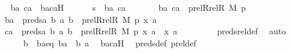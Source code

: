 \begin{isabellebody}
\ \ \ \ \isamarkupfalse%
\ \isamarkupfalse%
\ ba\ ca\ \ bacaH{\isacharcolon}{\kern0pt}\isanewline
\ \ \ \ \ \ {\isachardoublequoteopen}s\ {\isacharequal}{\kern0pt}\ {\isacharless}{\kern0pt}ba{\isacharcomma}{\kern0pt}\ ca{\isachargreater}{\kern0pt}{\isachardoublequoteclose}\ \isanewline
\ \ \ \ \ \ {\isachardoublequoteopen}{\isacharless}{\kern0pt}ba{\isacharcomma}{\kern0pt}\ ca{\isachargreater}{\kern0pt}\ {\isasymin}\ prel{\isacharparenleft}{\kern0pt}Rrel{\isacharparenleft}{\kern0pt}R{\isacharcomma}{\kern0pt}\ M{\isacharparenright}{\kern0pt}{\isacharcomma}{\kern0pt}\ p{\isacharparenright}{\kern0pt}{\isachardoublequoteclose}\ \isanewline
\ \ \ \ \ \ {\isachardoublequoteopen}ba\ {\isasymin}\ preds{\isacharparenleft}{\kern0pt}{\isasymlambda}a\ b{\isachardot}{\kern0pt}\ {\isasymlangle}a{\isacharcomma}{\kern0pt}\ b{\isasymrangle}\ {\isasymin}\ prel{\isacharparenleft}{\kern0pt}Rrel{\isacharparenleft}{\kern0pt}R{\isacharcomma}{\kern0pt}\ M{\isacharparenright}{\kern0pt}{\isacharcomma}{\kern0pt}\ p{\isacharparenright}{\kern0pt}{\isacharcomma}{\kern0pt}\ {\isasymlangle}x{\isacharcomma}{\kern0pt}\ a{\isasymrangle}{\isacharparenright}{\kern0pt}{\isachardoublequoteclose}\ \isanewline
\ \ \ \ \ \ {\isachardoublequoteopen}ca\ {\isasymin}\ {\isacharparenleft}{\kern0pt}preds{\isacharparenleft}{\kern0pt}{\isasymlambda}a\ b{\isachardot}{\kern0pt}\ {\isasymlangle}a{\isacharcomma}{\kern0pt}\ b{\isasymrangle}\ {\isasymin}\ prel{\isacharparenleft}{\kern0pt}Rrel{\isacharparenleft}{\kern0pt}R{\isacharcomma}{\kern0pt}\ M{\isacharparenright}{\kern0pt}{\isacharcomma}{\kern0pt}\ p{\isacharparenright}{\kern0pt}{\isacharcomma}{\kern0pt}\ {\isasymlangle}x{\isacharcomma}{\kern0pt}\ a{\isasymrangle}{\isacharparenright}{\kern0pt}\ {\isasymunion}\ {\isacharbraceleft}{\kern0pt}{\isasymlangle}x{\isacharcomma}{\kern0pt}\ a{\isasymrangle}{\isacharbraceright}{\kern0pt}{\isacharparenright}{\kern0pt}{\isachardoublequoteclose}\ \isanewline
\ \ \ \ \ \ \isamarkupfalse%
\ preds{\isacharunderscore}{\kern0pt}rel{\isacharunderscore}{\kern0pt}def\ \isamarkupfalse%
\ auto\isanewline
\ \ \ \ \isanewline
\ \ \ \ \isamarkupfalse%
\ b\ \ baeq{\isacharcolon}{\kern0pt}\ {\isachardoublequoteopen}ba\ {\isacharequal}{\kern0pt}\ {\isacharless}{\kern0pt}b{\isacharcomma}{\kern0pt}\ a{\isachargreater}{\kern0pt}{\isachardoublequoteclose}\ \isamarkupfalse%
\ bacaH\ \isamarkupfalse%
\ preds{\isacharunderscore}{\kern0pt}def\ prel{\isacharunderscore}{\kern0pt}def\ \isamarkupfalse%

\end{isabellebody}
